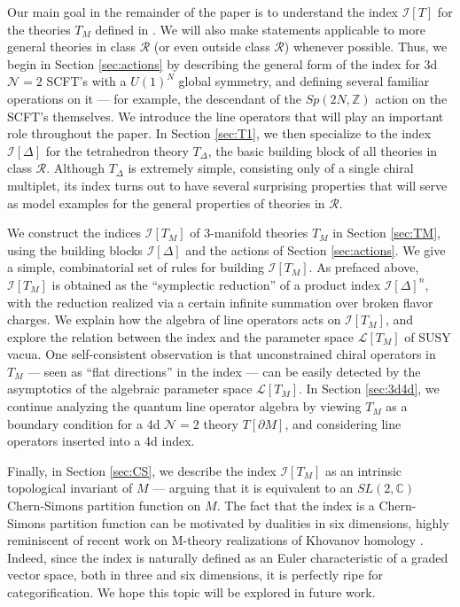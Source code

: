 \documentclass[11pt,letterpaper]{article}
\numberwithin{equation}{section}
\newcommand{\Z}{{\mathbb Z}}
\newcommand{\C}{{\mathbb C}}
\newcommand{\pd}{\partial}
\newcommand{\CI}{\mathcal{I}}
\newcommand{\CL}{\mathcal{L}}
\newcommand{\CN}{\mathcal{N}}
\newcommand{\CR}{\mathcal{R}}
\begin{document}
Our main goal in the remainder of the paper is to understand the index $\CI[T]$ for the theories $T_M$ defined in \cite{DGG}. We will also make statements applicable to more general theories in class $\CR$ (or even outside class $\CR$) whenever possible. Thus, we begin in Section \ref{sec:actions} by describing the general form of the index for 3d $\CN=2$ SCFT's with a $U(1)^N$ global symmetry, and defining several familiar operations on it --- for example, the descendant of the $Sp(2N,\Z)$ action on the SCFT's themselves. We introduce the line operators that will play an important role throughout the paper. In Section \ref{sec:T1}, we then specialize to the index $\CI[\Delta]$ for the tetrahedron theory $T_\Delta$, the basic building block of all theories in class $\CR$. Although $T_\Delta$ is extremely simple, consisting only of a single chiral multiplet, its index turns out to have several surprising properties that will serve as model examples for the general properties of theories in $\CR$.

We construct the indices $\CI[T_M]$ of 3-manifold theories $T_M$ in Section \ref{sec:TM}, using the building blocks $\CI[\Delta]$ and the actions of Section \ref{sec:actions}. We give a simple, combinatorial set of rules for building $\CI[T_M]$. As prefaced above, $\CI[T_M]$ is obtained as the ``symplectic reduction'' of a product index $\CI[\Delta]^n$, with the reduction realized via a certain infinite summation over broken flavor charges. We explain how the algebra of line operators acts on $\CI[T_M]$, and explore the relation between the index and the parameter space $\CL[T_M]$ of SUSY vacua. One self-consistent observation is that unconstrained chiral operators in $T_M$ --- seen as ``flat directions'' in the index --- can be easily detected by the asymptotics of the algebraic parameter space $\CL[T_M]$. In Section \ref{sec:3d4d}, we continue analyzing the quantum line operator algebra by viewing $T_M$ as a boundary condition for a 4d $\CN=2$ theory $T[\pd M]$, and considering line operators inserted into a 4d index.

Finally, in Section \ref{sec:CS}, we describe the index $\CI[T_M]$ as an intrinsic topological invariant of $M$ --- arguing that it is equivalent to an $SL(2,\C)$ Chern-Simons partition function on $M$. The fact that the index is a Chern-Simons partition function can be motivated by dualities in six dimensions, highly reminiscent of recent work on M-theory realizations of Khovanov homology \cite{Wfiveknots}. Indeed, since the index is naturally defined as an Euler characteristic of a graded vector space, both in three and six dimensions, it is perfectly ripe for categorification. We hope this topic will be explored in future work.
\end{document}
